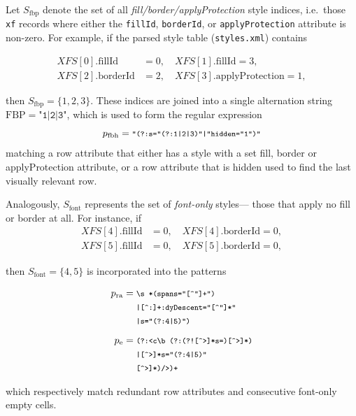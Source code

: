 \documentclass[conference]{IEEEtran}
\newcommand{\code}[1]{\text{\footnotesize\texttt{\detokenize{#1}}}}
\newcommand{\codeline}[1]{\text{\ttfamily\footnotesize\detokenize{#1}}}
\begin{document}
Let \(S_{\mathrm{fbp}}\) denote the set of all \emph{fill/border/applyProtection} style indices,
i.e.\ those \texttt{xf} records where either the \texttt{fillId},
\texttt{borderId}, or \texttt{applyProtection} attribute is non-zero.
For example, if the parsed style table (\texttt{styles.xml}) contains

\[
\begin{aligned}
XFS[0].\mathrm{fillId} &= 0, \quad XFS[1].\mathrm{fillId} = 3,\\
XFS[2].\mathrm{borderId} &= 2, \quad XFS[3].\mathrm{applyProtection} = 1,
\end{aligned}
\]

then \(S_{\mathrm{fbp}}=\{1,2,3\}\).
These indices are joined into a single alternation string
\(\mathrm{FBP} = \texttt{"1|2|3"}\),
which is used to form the regular expression
\[
p_{\text{fbh}} = \code{"(?:s="(?:1|2|3)"|"hidden="1")"}
\]
matching a row attribute that either has a style with a set fill, border or applyProtection attribute, or a row attribute that is hidden used to find the last visually relevant row.

Analogously, \(S_{\mathrm{font}}\) represents the set of \emph{font-only} styles—
those that apply no fill or border at all.
For instance, if
\[
\begin{aligned}
XFS[4].\mathrm{fillId} &= 0, \quad XFS[4].\mathrm{borderId} = 0,\\
XFS[5].\mathrm{fillId} &= 0, \quad XFS[5].\mathrm{borderId} = 0,
\end{aligned}
\]

\noindent then \(S_{\mathrm{font}}=\{4,5\}\) is incorporated into the patterns

\[
\begin{aligned}
p_{\text{ra}} &= 
  \begin{aligned}[t]
  &\codeline{\s*(spans="[^"]+")}\\[-1pt]
  &\codeline{|[^:]+:dyDescent="[^"]*"}\\[-1pt]
  &\codeline{|s="(?:4|5)")}
  \end{aligned}
\\[4pt]
p_{\text{e}}  &= 
  \begin{aligned}[t]
  &\codeline{(?:<c\b(?:(?![^>]*s=)[^>]*)}\\[-1pt]
  &\codeline{|[^>]*s="(?:4|5)"}\\[-1pt]
  &\codeline{[^>]*)/>)+}
  \end{aligned}
\end{aligned}
\]

\noindent which respectively match redundant row attributes and
consecutive font-only empty cells.
\end{document}
